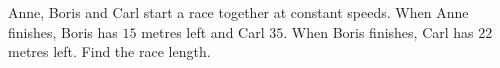 Anne, Boris and Carl start a race together at constant speeds. When Anne finishes, Boris has $15$ metres left and Carl $35$. When Boris finishes, Carl has $22$ metres left. Find the race length.
